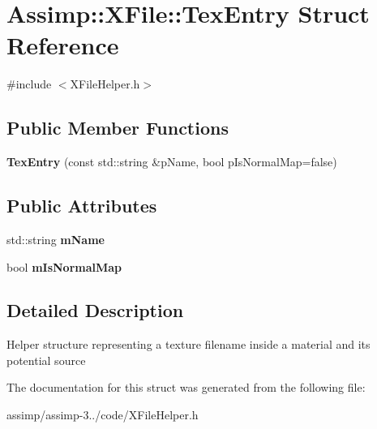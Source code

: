 \hypertarget{struct_assimp_1_1_x_file_1_1_tex_entry}{\section{Assimp\+:\+:X\+File\+:\+:Tex\+Entry Struct Reference}
\label{struct_assimp_1_1_x_file_1_1_tex_entry}
}


{\ttfamily \#include $<$X\+File\+Helper.\+h$>$}

\subsection*{Public Member Functions}
\begin{DoxyCompactItemize}
\item 
\hypertarget{struct_assimp_1_1_x_file_1_1_tex_entry_a0f30f3f1342b7ce7732d19ac2bf3e740}{{\bfseries Tex\+Entry} (const std\+::string \&p\+Name, bool p\+Is\+Normal\+Map=false)}\label{struct_assimp_1_1_x_file_1_1_tex_entry_a0f30f3f1342b7ce7732d19ac2bf3e740}

\end{DoxyCompactItemize}
\subsection*{Public Attributes}
\begin{DoxyCompactItemize}
\item 
\hypertarget{struct_assimp_1_1_x_file_1_1_tex_entry_a5e00aebd6c565fe86931d518a3cfbc9c}{std\+::string {\bfseries m\+Name}}\label{struct_assimp_1_1_x_file_1_1_tex_entry_a5e00aebd6c565fe86931d518a3cfbc9c}

\item 
\hypertarget{struct_assimp_1_1_x_file_1_1_tex_entry_aba5ff2c3a1f29422f8f982da4891ba1a}{bool {\bfseries m\+Is\+Normal\+Map}}\label{struct_assimp_1_1_x_file_1_1_tex_entry_aba5ff2c3a1f29422f8f982da4891ba1a}

\end{DoxyCompactItemize}


\subsection{Detailed Description}
Helper structure representing a texture filename inside a material and its potential source 

The documentation for this struct was generated from the following file\+:\begin{DoxyCompactItemize}
\item 
assimp/assimp-\/3../code/X\+File\+Helper.\+h\end{DoxyCompactItemize}
